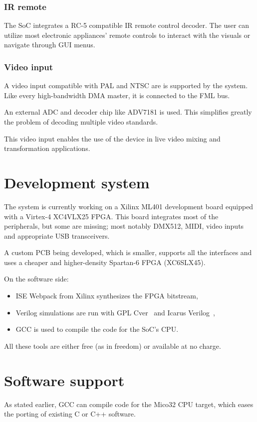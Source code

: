 \documentclass[a4paper,11pt,twocolumn]{paper}
\begin{document}
\subsubsection{IR remote}
The SoC integrates a RC-5 compatible IR remote control decoder. The user can utilize most electronic appliances' remote controls to interact with the visuals or navigate through GUI menus.

\subsubsection{Video input}
A video input compatible with PAL and NTSC are is supported by the system. Like every high-bandwidth DMA master, it is connected to the FML bus.

An external ADC and decoder chip like ADV7181 is used. This simplifies greatly the problem of decoding multiple video standards.

This video input enables the use of the device in live video mixing and transformation applications.

\section{Development system}
The system is currently working on a Xilinx ML401 development board equipped with a Virtex-4 XC4VLX25 FPGA. This board integrates most of the peripherals, but some are missing; most notably DMX512, MIDI, video inputs and appropriate USB transceivers.

A custom PCB being developed, which is smaller, supports all the interfaces and uses a cheaper and higher-density Spartan-6 FPGA (XC6SLX45).

On the software side:
\begin{itemize}
\item ISE Webpack from Xilinx synthesizes the FPGA bitstream,
\item Verilog simulations are run with GPL Cver~\cite{gplcver} and Icarus Verilog~\cite{icarus},
\item GCC is used to compile the code for the SoC's CPU.
\end{itemize}

All these tools are either free (as in freedom) or available at no charge.

\section{Software support}
As stated earlier, GCC can compile code for the Mico32 CPU target, which eases the porting of existing C or C++ software.
\end{document}
